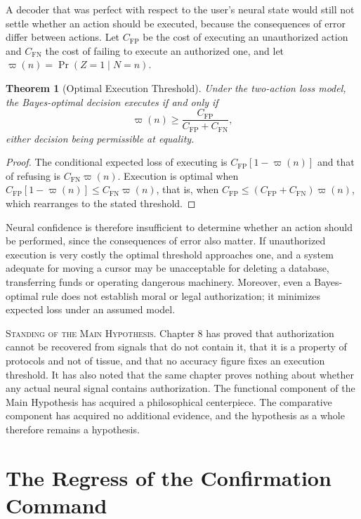 \documentclass[11pt,twoside,openany]{book}
\newtheorem{theorem}{Theorem}[chapter]
\theoremstyle{definition}
\theoremstyle{remark}
\newenvironment{standing}{\par\medskip\noindent\hrulefill\par\smallskip\noindent\textsc{Standing of the Main Hypothesis.}\enspace}{\par\smallskip\noindent\hrulefill\par\medskip}
\begin{document}
A decoder that was perfect with respect to the user's neural state would still not settle whether an action should be executed, because the consequences of error differ between actions. Let $C_{\mathrm{FP}}$ be the cost of executing an unauthorized action and $C_{\mathrm{FN}}$ the cost of failing to execute an authorized one, and let $\varpi(n)=\Pr(Z=1\mid N=n)$.

\begin{theorem}[Optimal Execution Threshold]\label{thm:threshold}
Under the two-action loss model, the Bayes-optimal decision executes if and only if
\[
\varpi(n)\ge\frac{C_{\mathrm{FP}}}{C_{\mathrm{FP}}+C_{\mathrm{FN}}},
\]
either decision being permissible at equality.
\end{theorem}
\begin{proof}
The conditional expected loss of executing is $C_{\mathrm{FP}}\left[1-\varpi(n)\right]$ and that of refusing is $C_{\mathrm{FN}}\varpi(n)$. Execution is optimal when $C_{\mathrm{FP}}\left[1-\varpi(n)\right]\le C_{\mathrm{FN}}\varpi(n)$, that is, when $C_{\mathrm{FP}}\le(C_{\mathrm{FP}}+C_{\mathrm{FN}})\varpi(n)$, which rearranges to the stated threshold.
\end{proof}

Neural confidence is therefore insufficient to determine whether an action should be performed, since the consequences of error also matter. If unauthorized execution is very costly the optimal threshold approaches one, and a system adequate for moving a cursor may be unacceptable for deleting a database, transferring funds or operating dangerous machinery. Moreover, even a Bayes-optimal rule does not establish moral or legal authorization; it minimizes expected loss under an assumed model.

\begin{standing}
Chapter 8 has proved that authorization cannot be recovered from signals that do not contain it, that it is a property of protocols and not of tissue, and that no accuracy figure fixes an execution threshold. It has also noted that the same chapter proves nothing about whether any actual neural signal contains authorization. The functional component of the Main Hypothesis has acquired a philosophical centerpiece. The comparative component has acquired no additional evidence, and the hypothesis as a whole therefore remains a hypothesis.
\end{standing}

\chapter{The Regress of the Confirmation Command}
\end{document}
